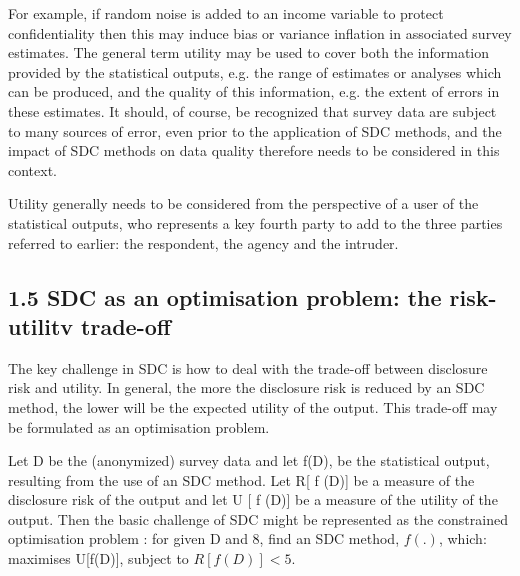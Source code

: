 For example, if random noise is added to an
income variable to protect confidentiality then this may induce bias or variance inﬂation
in associated survey estimates. The general term utility may be used to cover both the
information provided by the statistical outputs, e.g. the range of estimates or analyses
which can be produced, and the quality of this information, e.g. the extent of errors in
these estimates. It should, of course, be recognized that survey data are subject to many
sources of error, even prior to the application of SDC methods, and the impact of SDC
methods on data quality therefore needs to be considered in this context.

Utility generally needs to be considered from the perspective of a user of the
statistical outputs, who represents a key fourth party to add to the three parties referred to
earlier: the respondent, the agency and the intruder.
\subsection*{1.5 SDC as an optimisation problem: the risk-utilitv trade-off}
The key challenge in SDC is how to deal with the trade-off between disclosure risk
and utility. In general, the more the disclosure risk is reduced by an SDC method, the
lower will be the expected utility of the output. This trade-off may be formulated as an
optimisation problem. 

Let D be the (anonymized) survey data and let f(D), be the
statistical output, resulting from the use of an SDC method. Let R[ f (D)] be a measure of
the disclosure risk of the output and let U [ f (D)] be a measure of the utility of the
output. Then the basic challenge of SDC might be represented as the constrained
optimisation problem :
for given D and 8, find an SDC method, $f (.)$, which:
maximises U[f(D)], subject to $R[f(D)] < 5$.

